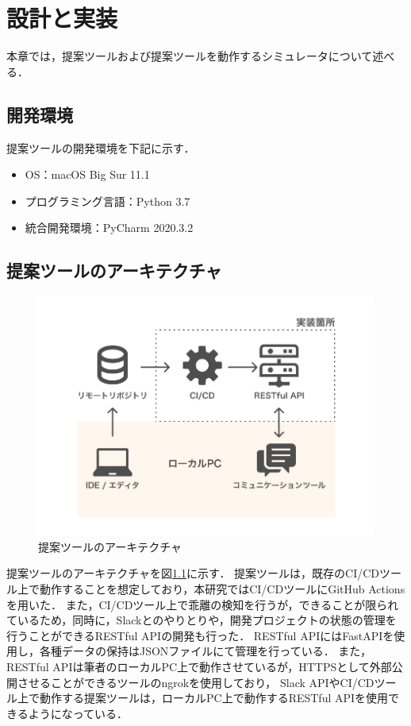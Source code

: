 \chapter{設計と実装}
本章では，提案ツールおよび提案ツールを動作するシミュレータについて述べる．

\section{開発環境}
提案ツールの開発環境を下記に示す．

\begin{itemize}
    \item OS：macOS Big Sur 11.1
    \item プログラミング言語：Python 3.7
    \item 統合開発環境：PyCharm 2020.3.2
\end{itemize}

\section{提案ツールのアーキテクチャ}
\label{toolartchitecture}

\begin{figure}[H]
    \centering
    \includegraphics[width=12cm]{images/architecture.png}
    \caption{提案ツールのアーキテクチャ}
    \label{architecture}
\end{figure}

提案ツールのアーキテクチャを図\ref{architecture}に示す．
提案ツールは，既存のCI/CDツール上で動作することを想定しており，本研究ではCI/CDツールにGitHub Actions\cite{actions}を用いた．
また，CI/CDツール上で乖離の検知を行うが，できることが限られているため，同時に，Slackとのやりとりや，開発プロジェクトの状態の管理を行うことができるRESTful APIの開発も行った．
RESTful APIにはFastAPIを使用し，各種データの保持はJSONファイルにて管理を行っている．
また，RESTful APIは筆者のローカルPC上で動作させているが，HTTPSとして外部公開させることができるツールのngrok\cite{ngrok}を使用しており，
Slack APIやCI/CDツール上で動作する提案ツールは，ローカルPC上で動作するRESTful APIを使用できるようになっている．

